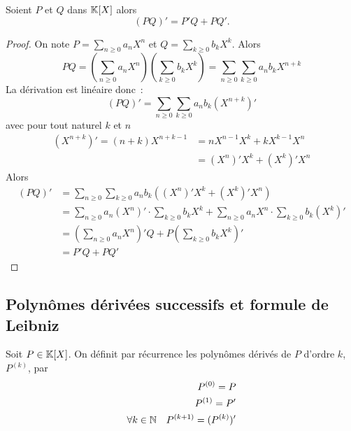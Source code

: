 \begin{prop}
  Soient \(P\) et \(Q\) dans \(\mathbb{K}[X]\) alors
  \begin{equation}
    (PQ)' = P'Q +PQ'.
  \end{equation}
\end{prop}
\begin{proof}
  On note \(P = \sum_{n \geqslant 0} a_n X^n\) et \(Q = \sum_{k \geqslant 0} b_k 
  X^k\). Alors
  \begin{equation}
    PQ = \left(\sum_{n \geqslant 0} a_n X^n\right) \left(\sum_{k \geqslant 0} 
    b_k X^k\right) = \sum_{n \geqslant 0} \sum_{k \geqslant 0} a_nb_k X^{n+k}
  \end{equation}
  La dérivation est linéaire donc~:
  \begin{equation}
    (PQ)' = \sum_{n \geqslant 0} \sum_{k \geqslant 0} a_nb_k (X^{n+k})'
  \end{equation}
  avec pour tout naturel \(k\) et \(n\)
  \begin{align}
    (X^{n+k})' =(n+k)X^{n+k-1} & = nX^{n-1}X^k +kX^{k-1}X^n\\
    & = (X^n)'X^k +(X^k)'X^n
  \end{align}
  Alors
  \begin{align}
    (PQ)' &= \sum_{n \geqslant 0} \sum_{k \geqslant 0} a_nb_k ((X^n)'X^k 
    +(X^k)'X^n) \\
    &= \sum_{n \geqslant 0} a_n (X^n)' \cdot \sum_{k \geqslant 0} b_k X^k + 
    \sum_{n \geqslant 0} a_n X^n \cdot \sum_{k \geqslant 0} b_k (X^k)' \\
    &= \left(\sum_{n \geqslant 0} a_n X^n\right)' Q + P \left(\sum_{k \geqslant 
    0} b_k X^k\right)' \\
    & = P'Q+PQ'
  \end{align}
\end{proof}

\subsection{Polynômes dérivées successifs et formule de Leibniz}

\begin{defdef}
  Soit \(P \in \mathbb{K}[X]\). On définit par récurrence les polynômes dérivés de \(P\) 
  d'ordre \(k\), \(P^{(k)}\), par
  \begin{align}
    P^{(0)} = P\\
    P^{(1)} = P'\\
    \forall k \in \mathbb{N} \quad P^{(k+1)} = (P^{(k)})'
  \end{align}
\end{defdef}

